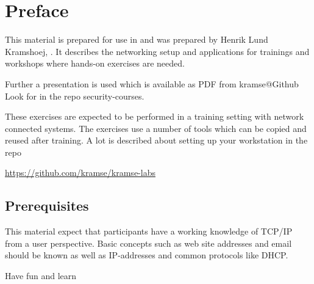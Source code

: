 \documentclass[a4paper,11pt,notitlepage]{report}
\begin{document}
\rm
{}

\newcommand{\emne}[1]{hacker workshop}
\newcommand{\kursus}[1]{ethical hacker workshop}
\newcommand{\kursusnavn}[1]{ethical hacker workshop\\ exercises}



\setcounter{tocdepth}{0}

\normal

{\color{titlecolor}\tableofcontents}

\normal
\pagestyle{fancyplain}
\chapter*{\color{titlecolor}Preface}

This material is prepared for use in \emph{\kursus} and was prepared by
Henrik Lund Kramshoej,  .
It describes the networking setup and
applications for trainings and workshops where hands-on exercises are needed.

\vskip 1cm
Further a presentation is used which is available as PDF from kramse@Github\\
Look for \jobname in the repo security-courses.

These exercises are expected to be performed in a training setting with network connected systems. The exercises use a number of tools which can be copied and reused after training. A lot is described about setting up your workstation in the repo

\url{https://github.com/kramse/kramse-labs}



\section*{\color{titlecolor}Prerequisites}

This material expect that participants have a working knowledge of
TCP/IP from a user perspective. Basic concepts such as web site addresses and email should be known as well as IP-addresses and common protocols like DHCP.

\vskip 1cm
Have fun and learn
\eject

\rhead{\fancyplain{}{\bf \chaptername\ \thechapter}}
\end{document}
